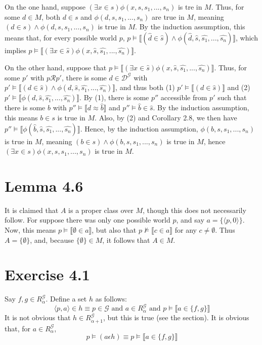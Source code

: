 \documentclass{article}
\newcommand{\lbc}{\llbracket}
\newcommand{\rbc}{\rrbracket}
\theoremstyle{definition}
\begin{document}
On the one hand, suppose $(\exists x\in s)\phi(x,s,s_1,...,s_n)$ is tre in $M$. Thus, for some 
$d\in M$, both $d\in s$ and $\phi(d,s,s_1,...,s_n)$ are true in $M$, meaning
$(d\in s)\wedge\phi(d,s,s_1,...,s_n)$ is true in $M$. By the induction assumption, 
this means that, for every possible world $p$,
$p\vDash\lbc(\hat{d}\in\hat{s})\wedge\phi(\hat{d},\hat{s},\hat{s_1},...,\hat{s_n})\rbc$, which implies
$p\vDash\lbc(\exists x\in\hat{s})\phi(x,\hat{s},\hat{s_1},...,\hat{s_n})\rbc$.

On the other hand, suppose that $p\vDash\lbc(\exists x\in\hat{s})\phi(x,\hat{s},\hat{s_1},...,\hat{s_n})\rbc$. Thus, for 
some $p'$ with $p\mathcal{R}p'$, there is some $d\in\mathcal{D}^\mathcal{G}$ with 
$p'\vDash\lbc(d\in\hat{s})\wedge\phi(d,\hat{s},\hat{s_1},...,\hat{s_n})\rbc$, and thus both
(1) $p'\vDash\lbc(d\in\hat{s})\rbc$ and (2) $p'\vDash\lbc\phi(d,\hat{s},\hat{s_1},...,\hat{s_n})\rbc$. By (1),
there is some $p''$ accessible from $p'$ such that there is some $b$ with 
$p''\vDash\lbc d\approx\hat{b}\rbc$ and $p''\vDash\hat{b}\in\hat{s}$. By the induction assumption, this means
$b\in s$ is true in $M$. Also, by (2) and Corollary 2.8, we then have $p''\vDash\lbc\phi(\hat{b},\hat{s},\hat{s_1},...,\hat{s_n})\rbc$. Hence, by 
the induction assumption, $\phi(b,s,s_1,...,s_n)$ is true in $M$, meaning
$(b\in s)\wedge\phi(b,s,s_1,...,s_n)$ is true in $M$, hence
$(\exists x\in s)\phi(x,s,s_1,...,s_n)$ is true in $M$. 

\section*{Lemma 4.6}
It is claimed that $A$ is a proper class over $M$, though this does not necessarily follow. 
For suppose there was only one possible world $p$, and say $a=\{\langle p,0\rangle\}$. Now, 
this means $p\vDash\lbc\emptyset\in a\rbc$, but also that 
$p\nvDash\lbc c\in a\rbc$ for any $c\ne\emptyset$. Thus $A=\{\emptyset\}$, and,
because $\{\emptyset\}\in M$, it follows that $A\in M$.

\section*{Exercise 4.1}
Say $f,g\in R^\mathcal{G}_\alpha$. Define a set $h$ as follows:
\[ \langle p,a\rangle\in h\equiv p\in\mathcal{G}\textrm{ and }a\in R^\mathcal{G}_\alpha\textrm{ and }p\vDash\lbc a\in\{f,g\}\rbc \]
It is not obvious that $h\in R^\mathcal{G}_{\alpha+1}$, but this is true (see the  section). 
It is obvious that, for $a\in R^\mathcal{G}_\alpha$, 
\[ p\vDash (a\epsilon h)\equiv p\vDash\lbc a\in\{f,g\}\rbc \]
\end{document}
